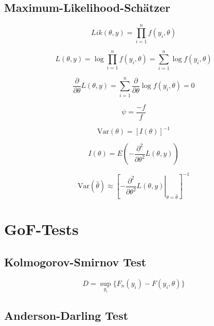 \subsection{Maximum-Likelihood-Schätzer}

\begin{equation}
\mathit{Lik}(\theta, y) = \prod_{i=1}^n f(y_i, \theta)
\end{equation}

\begin{equation}
L(\theta, y) = \log \prod_{i=1}^n f(y_i, \theta) = \sum_{i=1}^n \log f(y_i, \theta)
\end{equation}

\begin{equation}
\frac{\partial}{\partial \theta} L(\theta, y) = \sum_{i=1}^n \frac{\partial}{\partial \theta} \log f(y_i, \theta) = 0
\end{equation}

\begin{equation}
\psi = \frac{ -f }{ f }
\end{equation}

\begin{equation}
\mathrm{Var}(\theta) = \left[ I(\theta) \right]^{-1}
\end{equation}

\begin{equation}
I(\theta) = E \left(- \frac{\partial^2}{\partial \theta^2} L(\theta, y) \right) 
\end{equation}

\begin{equation}
\mathrm{Var}(\hat{\theta}) \approx \left[ \left. - \frac{\partial^2}{\partial \theta^2} L(\theta, y) \right|_{\theta = \hat{\theta}} \right]^{-1}
\end{equation}

\section{GoF-Tests}

\subsection{Kolmogorov-Smirnov Test}

\begin{equation}
D = \underset{y_i}{\sup} \{ F_n(y_i) - F(y_i, \theta) \}
\end{equation}

\subsection{Anderson-Darling Test}

